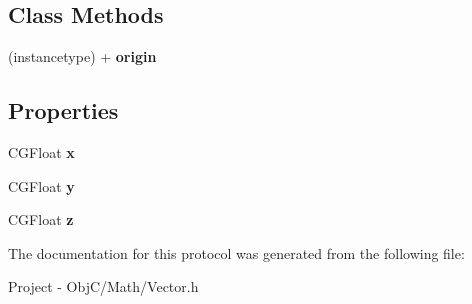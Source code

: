 \subsection*{Class Methods}
\begin{DoxyCompactItemize}
\item 
\hypertarget{protocol_vector_export-p_aedd5834fab41df0feed654b3b446e4e2}{}(instancetype) + {\bfseries origin}\label{protocol_vector_export-p_aedd5834fab41df0feed654b3b446e4e2}

\end{DoxyCompactItemize}
\subsection*{Properties}
\begin{DoxyCompactItemize}
\item 
\hypertarget{protocol_vector_export-p_ad9a3934e350e7d8c3089ec82447d2e6f}{}C\+G\+Float {\bfseries x}\label{protocol_vector_export-p_ad9a3934e350e7d8c3089ec82447d2e6f}

\item 
\hypertarget{protocol_vector_export-p_a13c056eb1129bfdfbc8d01817b86a6f3}{}C\+G\+Float {\bfseries y}\label{protocol_vector_export-p_a13c056eb1129bfdfbc8d01817b86a6f3}

\item 
\hypertarget{protocol_vector_export-p_adb9fd71b88326c02f0bb3acdc289054a}{}C\+G\+Float {\bfseries z}\label{protocol_vector_export-p_adb9fd71b88326c02f0bb3acdc289054a}

\end{DoxyCompactItemize}


The documentation for this protocol was generated from the following file\+:\begin{DoxyCompactItemize}
\item 
Project -\/ Obj\+C/\+Math/Vector.\+h\end{DoxyCompactItemize}
